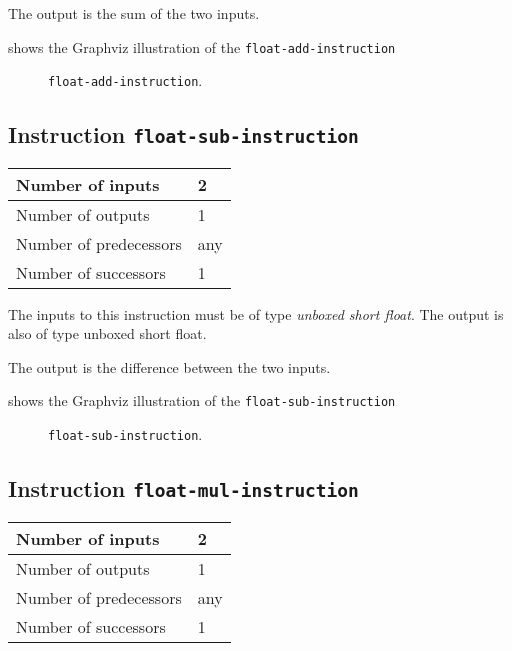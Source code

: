 The output is the sum of the two inputs.

 shows the Graphviz illustration of the
\texttt{float-add-instruction}

\begin{figure}
\begin{center}
\end{center}
\caption{\label{fig-float-add-instruction}
\texttt{float-add-instruction}.}
\end{figure}

\subsection{Instruction \texttt{float-sub-instruction}}
\label{mir-instruction-float-sub}

\begin{tabular}{|l|l|}
\hline
Number of inputs & 2\\
\hline
Number of outputs & 1\\
\hline
Number of predecessors & any\\
\hline
Number of successors & 1\\
\hline
\end{tabular}

The inputs to this instruction must be of type \emph{unboxed short
  float}. The output is also of type unboxed short float.

The output is the difference between the two inputs.

 shows the Graphviz illustration of the
\texttt{float-sub-instruction}

\begin{figure}
\begin{center}
\end{center}
\caption{\label{fig-float-sub-instruction}
\texttt{float-sub-instruction}.}
\end{figure}

\subsection{Instruction \texttt{float-mul-instruction}}
\label{mir-instruction-float-mul}

\begin{tabular}{|l|l|}
\hline
Number of inputs & 2\\
\hline
Number of outputs & 1\\
\hline
Number of predecessors & any\\
\hline
Number of successors & 1\\
\hline
\end{tabular}


